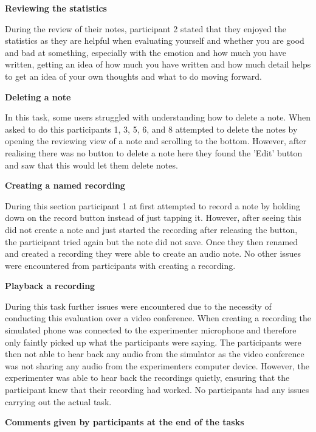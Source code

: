 \documentclass{l4proj}
\begin{document}
\textbf{Reviewing the statistics}

During the review of their notes, participant 2 stated that they enjoyed the statistics as they are helpful when evaluating yourself and whether you are good and bad at something, especially with the emotion and how much you have written, getting an idea of how much you have written and how much detail helps to get an idea of your own thoughts and what to do moving forward.

\textbf{Deleting a note}
 
In this task, some users struggled with understanding how to delete a note. When asked to do this participants 1, 3, 5, 6, and 8 attempted to delete the notes by opening the reviewing view of a note and scrolling to the bottom. However, after realising there was no button to delete a note here they found the 'Edit' button and saw that this would let them delete notes. 

\textbf{Creating a named recording}

During this section participant 1 at first attempted to record a note by holding down on the record button instead of just tapping it. However, after seeing this did not create a note and just started the recording after releasing the button, the participant tried again but the note did not save. Once they then renamed and created a recording they were able to create an audio note. No other issues were encountered from participants with creating a recording.

\textbf{Playback a recording}

During this task further issues were encountered due to the necessity of conducting this evaluation over a video conference. When creating a recording the simulated phone was connected to the experimenter microphone and therefore only faintly picked up what the participants were saying. The participants were then not able to hear back any audio from the simulator as the video conference was not sharing any audio from the experimenters computer device. However, the experimenter was able to hear back the recordings quietly, ensuring that the participant knew that their recording had worked. No participants had any issues carrying out the actual task.

\textbf{Comments given by participants at the end of the tasks}
\end{document}
